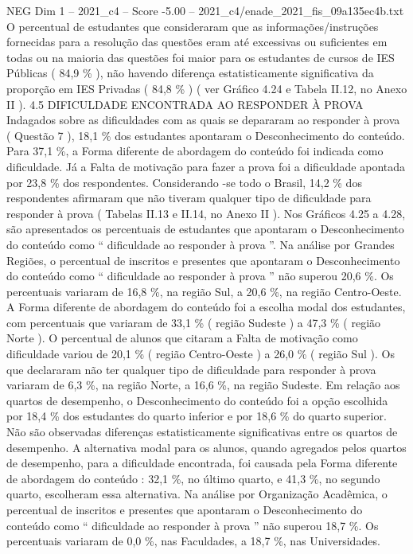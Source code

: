 \begin{textsample}{NEG Dim 1 – 2021\_c4 – Score -5.00 – 2021\_c4/enade\_2021\_fis\_09a135ec4b.txt}
O percentual de estudantes que consideraram que as informações/instruções fornecidas para a resolução das questões eram até excessivas ou suficientes em todas ou na maioria das questões foi maior para os estudantes de cursos de IES Públicas ( 84,9 \% ), não havendo diferença estatisticamente significativa da proporção em IES Privadas ( 84,8 \% ) ( ver Gráfico 4.24 e Tabela II.12, no Anexo II ). 4.5 DIFICULDADE ENCONTRADA AO RESPONDER À PROVA Indagados sobre as dificuldades com as quais se depararam ao responder à prova ( Questão 7 ), 18,1 \% dos estudantes apontaram o Desconhecimento do conteúdo.
Para 37,1 \%, a Forma diferente de abordagem do conteúdo foi indicada como dificuldade.
Já a Falta de motivação para fazer a prova foi a dificuldade apontada por 23,8 \% dos respondentes.
Considerando -se todo o Brasil, 14,2 \% dos respondentes afirmaram que não tiveram qualquer tipo de dificuldade para responder à prova ( Tabelas II.13 e II.14, no Anexo II ).
Nos Gráficos 4.25 a 4.28, são apresentados os percentuais de estudantes que apontaram o Desconhecimento do conteúdo como “ dificuldade ao responder à prova ”.
Na análise por Grandes Regiões, o percentual de inscritos e presentes que apontaram o Desconhecimento do conteúdo como “ dificuldade ao responder à prova ” não superou 20,6 \%.
Os percentuais variaram de 16,8 \%, na região Sul, a 20,6 \%, na região Centro-Oeste.
A Forma diferente de abordagem do conteúdo foi a escolha modal dos estudantes, com percentuais que variaram de 33,1 \% ( região Sudeste ) a 47,3 \% ( região Norte ).
O percentual de alunos que citaram a Falta de motivação como dificuldade variou de 20,1 \% ( região Centro-Oeste ) a 26,0 \% ( região Sul ).
Os que declararam não ter qualquer tipo de dificuldade para responder à prova variaram de 6,3 \%, na região Norte, a 16,6 \%, na região Sudeste.
Em relação aos quartos de desempenho, o Desconhecimento do conteúdo foi a opção escolhida por 18,4 \% dos estudantes do quarto inferior e por 18,6 \% do quarto superior.
Não são observadas diferenças estatisticamente significativas entre os quartos de desempenho.
A alternativa modal para os alunos, quando agregados pelos quartos de desempenho, para a dificuldade encontrada, foi causada pela Forma diferente de abordagem do conteúdo : 32,1 \%, no último quarto, e 41,3 \%, no segundo quarto, escolheram essa alternativa.
Na análise por Organização Acadêmica, o percentual de inscritos e presentes que apontaram o Desconhecimento do conteúdo como “ dificuldade ao responder à prova ” não superou 18,7 \%.
Os percentuais variaram de 0,0 \%, nas Faculdades, a 18,7 \%, nas Universidades.

\end{textsample}
